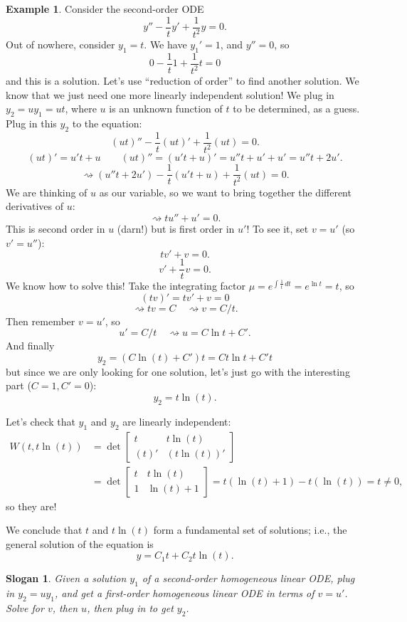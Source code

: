 \documentclass[12pt]{amsart}
\numberwithin{equation}{section}
\theoremstyle{plain} %
\newtheorem{slogan}[equation]{Slogan}
\newcommand{\rsa}{\rightsquigarrow}
\theoremstyle{definition}
\newtheorem{ex}[equation]{Example}
\theoremstyle{remark}
\begin{document}
\begin{ex} Consider the second-order ODE
\[ y'' - \frac{1}{t} y' + \frac{1}{t^2} y = 0.\]
Out of nowhere, consider $y_1= t$.
We have $y_1 ' = 1$, and $y'' = 0$, so
\[ 0 - \frac{1}{t} 1 + \frac{1}{t^2} t = 0\]
and this is a solution.
Let's use ``reduction of order'' to find another solution. We know that we just need one more linearly independent solution! We plug in $y_2= u y_1 = u t$, where $u$ is an unknown function of $t$ to be determined, as a guess.
Plug in this $y_2$ to the equation:
\[ (u t)'' -  \frac{1}{t} (ut)' + \frac{1}{t^2} (ut) = 0.\]
\[ (ut)' = u' t + u \qquad (ut)'' = (u' t + u )' = u'' t + u' + u' = u'' t + 2 u'.\]
\[ \rsa (u'' t + 2 u') -  \frac{1}{t} (u' t + u) + \frac{1}{t^2} (ut) = 0.\]
We are thinking of $u$ as our variable, so we want to bring together the different derivatives of $u$:
\[ \rsa t u''  + u' =0 .\]
This is second order in $u$ (darn!) but is first order in $u'$! To see it, set $v=u'$ (so $v'=u''$):
\[ t v' + v = 0.\]
\[ v' + \frac{1}{t} v = 0.\]
We know how to solve this!
Take the integrating factor $\mu = e^{\int \frac{1}{t} \, dt} = e^{\ln t} = t$, so
\[ (tv)' = tv' + v = 0\]
\[\rsa tv = C \quad \rsa v= C/t. \]
Then remember $v=u'$, so
\[ u' = C/t \quad \rsa u= C \ln t + C'.\]
And finally
\[ y_2 =  (C \ln(t) + C')t = C t \ln t + C' t\]
but since we are only looking for one solution, let's just go with the interesting part ($C=1, C'=0$):
\[ y_2 = t \ln(t).\]

Let's check that $y_1$ and $y_2$ are linearly independent:
\begin{align*} W( t, t \ln(t) ) &=  \det \begin{bmatrix} t & t \ln(t) \\ (t)' &(t \ln(t))' \end{bmatrix} \\&= \det \begin{bmatrix} t & t \ln(t) \\ 1 & \ln(t) + 1 \end{bmatrix} = t(\ln(t) +1) - t(\ln(t)) = t\neq 0,\end{align*}
so they are!

We conclude that $t$ and $t \ln(t)$ form a fundamental set of solutions; i.e., the general solution of the equation is
\[ y =C_1 t + C_2 t \ln(t).\]
\end{ex}
 

 

\begin{slogan}
Given a solution $y_1$ of a second-order homogeneous linear ODE, plug in $y_2= u y_1$, and get a first-order homogeneous linear ODE in terms of $v=u'$. Solve for $v$, then $u$, then plug in to get $y_2$.
\end{slogan}
\end{document}
